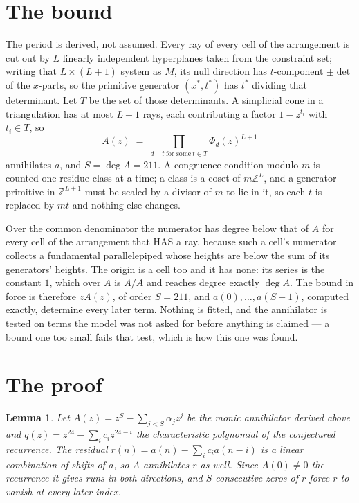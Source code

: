 \documentclass[11pt,a4paper]{article}
\theoremstyle{plain}
\newtheorem{lemma}[theorem]{Lemma}
\theoremstyle{definition}
\begin{document}
\section{The bound}

The period is derived, not assumed. Every ray of every cell of the arrangement is cut out by
$L$ linearly independent hyperplanes taken from the constraint set; writing that $L\times(L+1)$
system as $M$, its null direction has $t$-component $\pm\det$ of the $x$-parts, so the
primitive generator $(x^*,t^*)$ has $t^*$ dividing that determinant. Let $T$ be the set of
those determinants. A simplicial cone in a triangulation has at most $L+1$ rays, each
contributing a factor $1-z^{t_i}$ with $t_i\in T$, so
\[
A(z)\;=\;\prod_{d\,\mid\,t\ \text{for some}\ t\in T}\Phi_d(z)^{L+1}
\]
annihilates $a$, and $S=\deg A=211$. A congruence condition modulo $m$ is counted one residue
class at a time; a class is a coset of $m\mathbb{Z}^L$, and a generator primitive in
$\mathbb{Z}^{L+1}$ must be scaled by a divisor of $m$ to lie in it, so each $t$ is replaced
by $mt$ and nothing else changes.

Over the common denominator the numerator has degree below that of $A$ for every cell of the
arrangement that HAS a ray, because such a cell's numerator collects a fundamental
parallelepiped whose heights are below the sum of its generators' heights. The origin is a cell
too and it has none: its series is the constant $1$, which over $A$ is $A/A$ and reaches degree
exactly $\deg A$. The bound in force is therefore $zA(z)$, of order $S=211$, and
$a(0),\dots,a(S-1)$, computed exactly, determine every later term. Nothing is fitted, and the
annihilator is tested on terms the model was not asked for before anything is claimed --- a
bound one too small fails that test, which is how this one was found.

\section{The proof}

\begin{lemma}\label{lem:crit}
Let $A(z)=z^S-\sum_{j<S}\alpha_jz^{j}$ be the monic annihilator derived above and
$q(z)=z^{24}-\sum_ic_iz^{24-i}$ the characteristic polynomial of the conjectured
recurrence. The residual $r(n)=a(n)-\sum_ic_ia(n-i)$ is a linear combination of shifts of $a$,
so $A$ annihilates $r$ as well. Since $A(0)\ne0$ the recurrence it gives runs in both
directions, and $S$ consecutive zeros of $r$ force $r$ to vanish at every later index.
\end{lemma}
\end{document}

